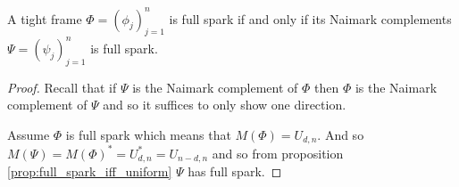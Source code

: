 \begin{corollary}
\label{cor:naimark_full_spark}
A tight frame $\Phi=(\phi_j)_{j=1}^n$ is full spark if and only if its Naimark complements $\Psi=(\psi_j)_{j=1}^n$ is full spark.
\end{corollary}
\begin{proof}
    Recall that if $\Psi$ is the Naimark complement of $\Phi$ then $\Phi$ is the Naimark complement of $\Psi$ and so it suffices to only show one direction.
    
    Assume $\Phi$ is full spark which means that $M(\Phi)=U_{d,n}$. And so $M(\Psi)=M(\Phi)^*=U_{d,n}^*=U_{n-d,n}$ and so from proposition \ref{prop:full_spark_iff_uniform} $\Psi$ has full spark.
\end{proof}

